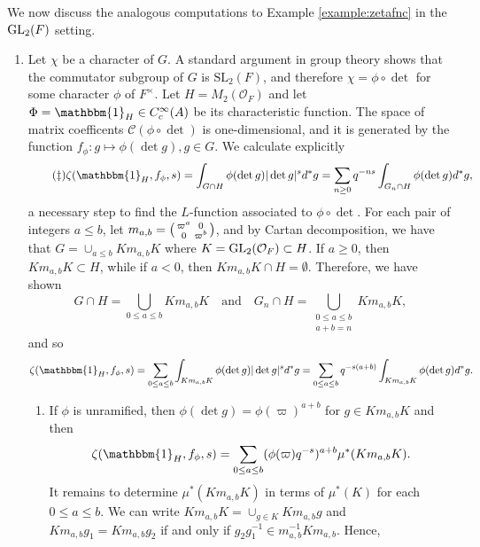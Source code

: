 \begin{example}\label{example:zetafncgl2}
    We now discuss the analogous computations to Example \ref{example:zetafnc} in the $\mathrm{GL}_2(F)$ setting. 
    \begin{enumerate}[(1)]
        \item Let $\chi$ be a character of $G$. A standard argument in group theory shows that the commutator subgroup of $G$ is $\mathrm{SL}_2(F)$, and therefore $\chi=\phi\circ\det$ for some character $\phi$ of $F^\times$. Let $H=M_2(\mathcal{O}_F)$ and let $\Phi=\mathbbm{1}_H\in C_c^\infty(A)$ be its characteristic function. The space of matrix coefficents $\mathcal{C}(\phi\circ\det)$ is one-dimensional, and it is generated by the function $f_\phi:g\mapsto\phi(\det g),g\in G$. We calculate explicitly 
        \begin{equation}\tag{\ddag}\label{eqn:zetagl2}
            \zeta(\mathbbm{1}_H,f_\phi,s)=\int_{G\cap H}\phi(\det g)|\det g|^sd^*g=\sum_{n\geq 0}q^{-ns}\int_{G_n\cap H}\phi(\det g)d^*g,
        \end{equation}
        a necessary step to find the $L$-function associated to $\phi\circ\det$. For each pair of integers $a\leq b$, let $m_{a,b}=\begin{psmallmatrix}
            \varpi^a & 0\\
            0 & \varpi^b\\
        \end{psmallmatrix}$, and by Cartan decomposition, we have that $G=\cup_{a\leq b}K m_{a,b}K$ where $K=\mathrm{GL}_2(\mathcal{O}_F)\subset H$. If $a\geq 0$, then $Km_{a,b}K\subset H$, while if $a<0$, then $Km_{a,b}K\cap H=\emptyset$. Therefore, we have shown 
        $$G\cap H=\bigcup_{0\leq a\leq b}Km_{a,b}K\quad\text{and}\quad G_n\cap H=\bigcup_{\substack{0\leq a\leq b \\ a+b=n}} Km_{a,b}K,$$ and so
        $$\zeta(\mathbbm{1}_H,f_\phi,s)=\sum_{0\leq a\leq b}\int_{Km_{a,b}K}\phi(\det g)|\det g|^sd^*g=\sum_{0\leq a\leq b}q^{-s(a+b)}\int_{Km_{a,b}K}\phi(\det g)d^*g.$$
        \begin{enumerate}
            \item If $\phi$ is unramified, then $\phi(\det g)=\phi(\varpi)^{a+b}$ for $g\in Km_{a,b}K$ and then
            $$\zeta(\mathbbm{1}_H,f_\phi,s)=\sum_{0\leq a\leq b}(\phi(\varpi)q^{-s})^{a+b}\mu^*(Km_{a,b}K).$$
            It remains to determine $\mu^*(Km_{a,b}K)$ in terms of $\mu^*(K)$ for each $0\leq a\leq b$. We can write 
            $Km_{a,b}K=\cup_{g\in K}Km_{a,b}g$
            and $Km_{a,b}g_1=Km_{a,b}g_2$ if and only if $g_2g_1^{-1}\in m_{a,b}^{-1}K m_{a,b}$. Hence,

\end{enumerate}
\end{enumerate}
\end{example}

